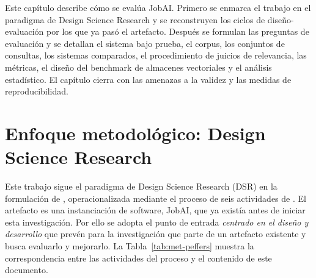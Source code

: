 Este capítulo describe cómo se evalúa JobAI. Primero se enmarca el trabajo en el paradigma de Design Science Research y se reconstruyen los ciclos de diseño-evaluación por los que ya pasó el artefacto. Después se formulan las preguntas de evaluación y se detallan el sistema bajo prueba, el corpus, los conjuntos de consultas, los sistemas comparados, el procedimiento de juicios de relevancia, las métricas, el diseño del benchmark de almacenes vectoriales y el análisis estadístico. El capítulo cierra con las amenazas a la validez y las medidas de reproducibilidad.

\section{Enfoque metodológico: Design Science Research}
\label{sec:met-dsr}

Este trabajo sigue el paradigma de Design Science Research (DSR) en la formulación de \citet{Hevner2004}, operacionalizada mediante el proceso de seis actividades de \citet{Peffers2007}. El artefacto es una instanciación de software, JobAI, que ya existía antes de iniciar esta investigación. Por ello se adopta el punto de entrada \emph{centrado en el diseño y desarrollo} que \citet{Peffers2007} prevén para la investigación que parte de un artefacto existente y busca evaluarlo y mejorarlo. La Tabla~\ref{tab:met-peffers} muestra la correspondencia entre las actividades del proceso y el contenido de este documento.

